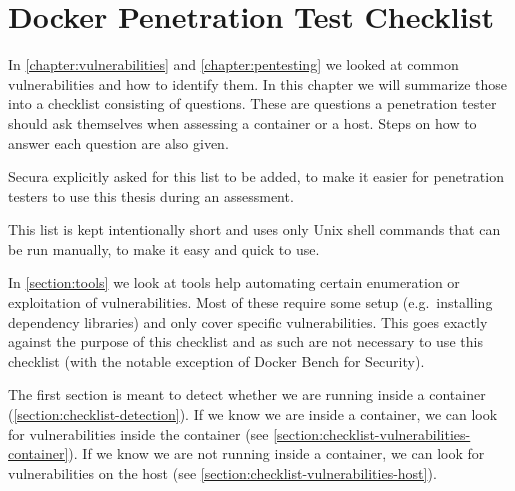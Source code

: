 \chapter{Docker Penetration Test Checklist}\label{chapter:checklist}
In \autoref{chapter:vulnerabilities} and \autoref{chapter:pentesting} we looked at common vulnerabilities and how to identify them. In this chapter we will summarize those into a checklist consisting of questions. These are questions a penetration tester should ask themselves when assessing a container or a host. Steps on how to answer each question are also given.

Secura explicitly asked for this list to be added, to make it easier for penetration testers to use this thesis during an assessment.

This list is kept intentionally short and uses only Unix shell commands that can be run manually, to make it easy and quick to use.

\medskip

In \autoref{section:tools} we look at tools help automating certain enumeration or exploitation of vulnerabilities. Most of these require some setup (e.g.\ installing dependency libraries) and only cover specific vulnerabilities. This goes exactly against the purpose of this checklist and as such are not necessary to use this checklist (with the notable exception of Docker Bench for Security).

\medskip

The first section is meant to detect whether we are running inside a container (\autoref{section:checklist-detection}). If we know we are inside a container, we can look for vulnerabilities inside the container (see \autoref{section:checklist-vulnerabilities-container}). If we know we are not running inside a container, we can look for vulnerabilities on the host (see \autoref{section:checklist-vulnerabilities-host}).




